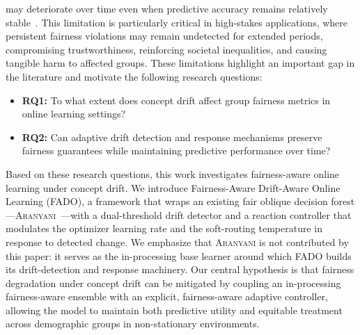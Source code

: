 \documentclass[sigconf,anonymous,review]{acmart}
\begin{document}
may deteriorate over time even when predictive accuracy remains relatively stable~\cite{Deho2025}. This limitation is particularly critical in high-stakes applications, 
where persistent fairness violations may remain undetected for extended periods, compromising trustworthiness, reinforcing societal inequalities, 
and causing tangible harm to affected groups. These limitations highlight an important gap in the literature and motivate the following research questions:
\begin{itemize}
\item \textbf{RQ1:} To what extent does concept drift affect group fairness metrics in online learning settings?
\item \textbf{RQ2:} Can adaptive drift detection and response mechanisms preserve fairness guarantees while maintaining predictive performance over time?
\end{itemize}
Based on these research questions, this work investigates fairness-aware online learning under concept drift. We introduce Fairness-Aware Drift-Aware Online Learning (\textsc{FADO}),
a framework that wraps an existing fair oblique decision forest—\textsc{Aranyani}~\cite{chowdhury2024enhancing}—with a dual-threshold drift detector and a reaction controller that
modulates the optimizer learning rate and the soft-routing temperature in response to detected change. We emphasize that \textsc{Aranyani} is not contributed by this paper:
it serves as the in-processing base learner around which \textsc{FADO} builds its drift-detection and response machinery. Our central hypothesis is that fairness degradation under
concept drift can be mitigated by coupling an in-processing fairness-aware ensemble with an explicit, fairness-aware adaptive controller, allowing the model to maintain both
predictive utility and equitable treatment across demographic groups in non-stationary environments.
\end{document}
